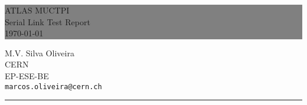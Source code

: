 \documentclass{report}
\begin{document}

\begin{titlepage} %
	
	
	\colorbox{grey}{
		\parbox[t]{0.93\textwidth}{ %
			\parbox[t]{0.91\textwidth}{ %
				\raggedleft %
				\fontsize{80pt}{40pt}\selectfont %
				\vspace{0.7cm} %

				ATLAS MUCTPI\\
				Serial Link Test Report\\
				\today\\
				
				\vspace{0.7cm} %
			}
		}
	}
	
	\vfill %
	
	
	\parbox[t]{0.93\textwidth}{ %
		\raggedleft %
		\large %
		{\Large M.V. Silva Oliveira}\\[4pt] %
		CERN\\
		EP-ESE-BE\\[4pt] %
		\texttt{marcos.oliveira@cern.ch}\\
		
		\hfill\rule{0.2\linewidth}{1pt}%
	}
	
\end{titlepage}

\tableofcontents
\newpage
\end{document}

